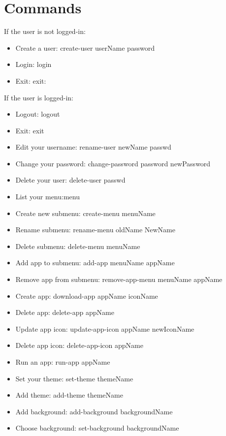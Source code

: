 \documentclass[12pt]{article}
\begin{document}
\section{Commands}
If the user is not logged-in:
\begin{itemize}
	\item Create a user: create-user userName password
	\item Login: login
	\item Exit: exit:
\end{itemize}
If the user is logged-in:
\begin{itemize}
	\item Logout: logout
	\item Exit: exit
	\item Edit your username: rename-user newName passwd
	\item Change your password: change-password password newPassword
	\item Delete your user: delete-user passwd
	\item List your menu:menu
	\item Create new submenu: create-menu menuName
	\item Rename submenu: rename-menu oldName NewName
	\item Delete submenu: delete-menu menuName
	\item Add app to submenu: add-app menuName appName
	\item Remove app from submenu: remove-app-menu menuName appName
	\item Create app: download-app appName iconName
	\item Delete app: delete-app appName
	\item Update app icon: update-app-icon appName newIconName
	\item Delete app icon: delete-app-icon appName
	\item Run an app: run-app appName
	\item Set your theme: set-theme themeName
	\item Add theme: add-theme themeName
	\item Add background: add-background backgroundName
	\item Choose background: set-background backgroundName
\end{itemize}
\end{document}
